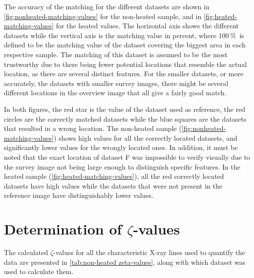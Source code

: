 The accuracy of the matching for the different datasets are shown in \cref{fig:nonheated-matching-values} for the non-heated sample, and in \cref{fig:heated-matching-values} for the heated values. The horizontal axis shows the different datasets while the vertical axis is the matching value in percent, where $\SI{100}{\percent}$ is defined to be the matching value of the dataset covering the biggest area in each respective sample. The matching of this dataset is assumed to be the most trustworthy due to there being fewer potential locations that resemble the actual location, as there are several distinct features. For the smaller datasets, or more accurately, the datasets with smaller survey images, there might be several different locations in the overview image that all give a fairly good match.

In both figures, the red star is the value of the dataset used as reference, the red circles are the correctly matched datasets while the blue squares are the datasets that resulted in a wrong location. The non-heated sample (\cref{fig:nonheated-matching-values}) shows high values for all the correctly located datasets, and significantly lower values for the wrongly located ones. In addition, it must be noted that the exact location of dataset F was impossible to verify visually due to the survey image not being large enough to distinguish specific features. In the heated sample (\cref{fig:heated-matching-values}), all the red correctly located datasets have high values while the datasets that were not present in the reference image have distinguishably lower values.

\section{Determination of $\zeta$-values}

The calculated $\zeta$-values for all the characteristic X-ray lines used to quantify the data are presented in \cref{tab:non-heated zeta-values}, along with which dataset was used to calculate them. 


